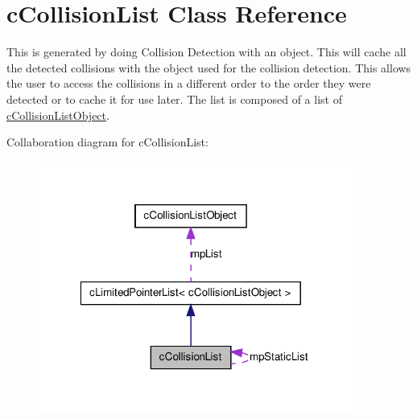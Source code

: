 \hypertarget{classc_collision_list}{
\section{cCollisionList Class Reference}
\label{classc_collision_list}
}


This is generated by doing Collision Detection with an object. This will cache all the detected collisions with the object used for the collision detection. This allows the user to access the collisions in a different order to the order they were detected or to cache it for use later. The list is composed of a list of \hyperlink{classc_collision_list_object}{cCollisionListObject}.  




Collaboration diagram for cCollisionList:\nopagebreak
\begin{figure}[H]
\begin{center}
\leavevmode
\includegraphics[width=292pt]{classc_collision_list__coll__graph}
\end{center}
\end{figure}
